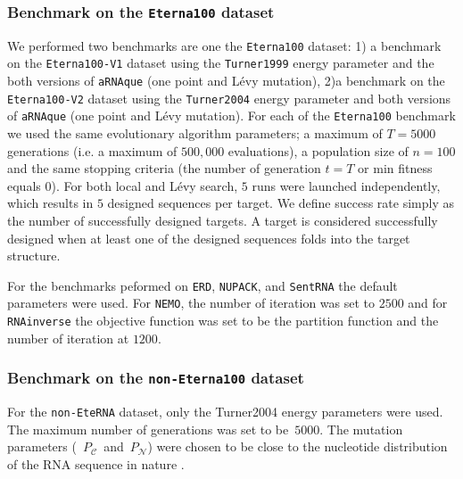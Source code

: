 \subsubsection*{Benchmark on the \texttt{Eterna100} dataset}
We performed two benchmarks are one the \texttt{Eterna100} dataset: 1) a benchmark on the \texttt{Eterna100-V1} dataset using the \texttt{Turner1999} energy parameter and the both versions of \texttt{aRNAque} (one point and Lévy mutation), 2)a benchmark on the \texttt{Eterna100-V2} dataset using the \texttt{Turner2004} energy parameter and both versions of \texttt{aRNAque} (one point and Lévy mutation).
For each of the \texttt{Eterna100} benchmark we used the same evolutionary algorithm parameters; a maximum of $T=5000$ generations (i.e. a maximum of  $500,000$ evaluations), a population size of $n=100$ and the same stopping criteria (the number of generation $t=T$ or min fitness equals $0$). For both local and Lévy search, $5$ runs were launched independently, which results in $5$ designed sequences per target. We define success rate simply as the number of successfully designed targets. A target is considered successfully designed when at least one of the designed sequences folds into the target structure. 

For the benchmarks peformed on \texttt{ERD}, \texttt{NUPACK}, and \texttt{SentRNA} the default parameters were used. For \texttt{NEMO}, the number of iteration was set to $2500$ and for \texttt{RNAinverse} the objective function was set to be the partition function and the number of iteration at $1200$. 
\subsubsection*{Benchmark on the \texttt{non-Eterna100} dataset}
For the \texttt{non-EteRNA} dataset,  only the Turner2004 energy parameters were used. The maximum number of generations was set to be~\(5000\). The mutation parameters (~\(P_{\mathcal{C}}\)~and~\(P_{\mathcal{N}}\)) were chosen to be close to the nucleotide distribution of the \ac{RNA} sequence in nature \cite{esmaili2015erd}.  

